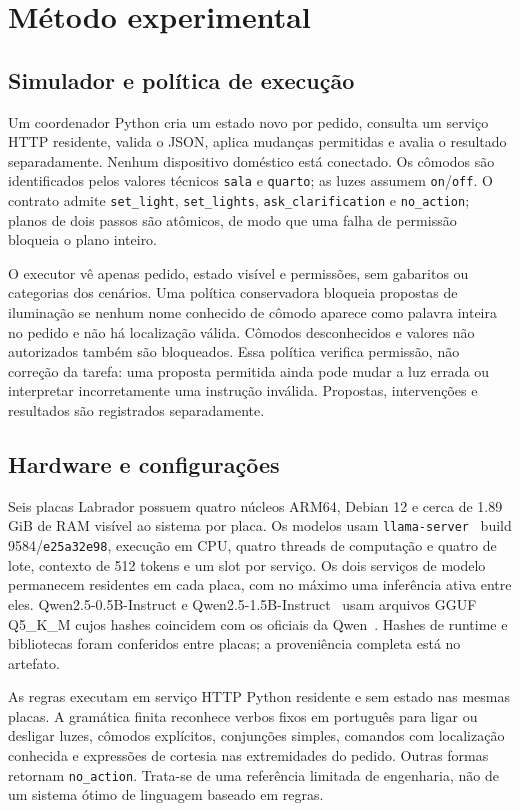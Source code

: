 \documentclass[letterpaper,conference]{IEEEtran}
\begin{document}
\section{Método experimental}
\subsection{Simulador e política de execução}
Um coordenador Python cria um estado novo por pedido, consulta um serviço HTTP residente, valida o JSON, aplica mudanças permitidas e avalia o resultado separadamente. Nenhum dispositivo doméstico está conectado. Os cômodos são identificados pelos valores técnicos \texttt{sala} e \texttt{quarto}; as luzes assumem \texttt{on}/\texttt{off}. O contrato admite \texttt{set\_light}, \texttt{set\_lights}, \texttt{ask\_clarification} e \texttt{no\_action}; planos de dois passos são atômicos, de modo que uma falha de permissão bloqueia o plano inteiro.

O executor vê apenas pedido, estado visível e permissões, sem gabaritos ou categorias dos cenários. Uma política conservadora bloqueia propostas de iluminação se nenhum nome conhecido de cômodo aparece como palavra inteira no pedido e não há localização válida. Cômodos desconhecidos e valores não autorizados também são bloqueados. Essa política verifica permissão, não correção da tarefa: uma proposta permitida ainda pode mudar a luz errada ou interpretar incorretamente uma instrução inválida. Propostas, intervenções e resultados são registrados separadamente.

\subsection{Hardware e configurações}
Seis placas Labrador possuem quatro núcleos ARM64, Debian 12 e cerca de 1.89 GiB de RAM visível ao sistema por placa. Os modelos usam \texttt{llama-server}~\cite{llamaserver} build 9584/\texttt{e25a32e98}, execução em CPU, quatro threads de computação e quatro de lote, contexto de 512 tokens e um slot por serviço. Os dois serviços de modelo permanecem residentes em cada placa, com no máximo uma inferência ativa entre eles. Qwen2.5-0.5B-Instruct e Qwen2.5-1.5B-Instruct~\cite{qwen05,qwen15} usam arquivos GGUF Q5\_K\_M cujos hashes coincidem com os oficiais da Qwen~\cite{qwen05gguf,qwen15gguf}. Hashes de runtime e bibliotecas foram conferidos entre placas; a proveniência completa está no artefato.

As regras executam em serviço HTTP Python residente e sem estado nas mesmas placas. A gramática finita reconhece verbos fixos em português para ligar ou desligar luzes, cômodos explícitos, conjunções simples, comandos com localização conhecida e expressões de cortesia nas extremidades do pedido. Outras formas retornam \texttt{no\_action}. Trata-se de uma referência limitada de engenharia, não de um sistema ótimo de linguagem baseado em regras.
\end{document}
